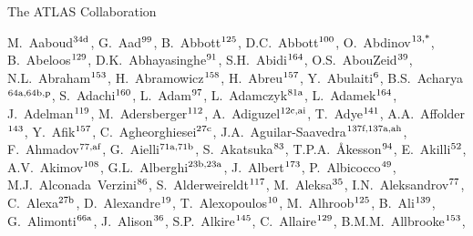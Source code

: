  
\begin{flushleft}
{\Large The ATLAS Collaboration}

\bigskip

M.~Aaboud$^\textrm{\scriptsize 34d}$,    
G.~Aad$^\textrm{\scriptsize 99}$,    
B.~Abbott$^\textrm{\scriptsize 125}$,    
D.C.~Abbott$^\textrm{\scriptsize 100}$,    
O.~Abdinov$^\textrm{\scriptsize 13,*}$,    
B.~Abeloos$^\textrm{\scriptsize 129}$,    
D.K.~Abhayasinghe$^\textrm{\scriptsize 91}$,    
S.H.~Abidi$^\textrm{\scriptsize 164}$,    
O.S.~AbouZeid$^\textrm{\scriptsize 39}$,    
N.L.~Abraham$^\textrm{\scriptsize 153}$,    
H.~Abramowicz$^\textrm{\scriptsize 158}$,    
H.~Abreu$^\textrm{\scriptsize 157}$,    
Y.~Abulaiti$^\textrm{\scriptsize 6}$,    
B.S.~Acharya$^\textrm{\scriptsize 64a,64b,p}$,    
S.~Adachi$^\textrm{\scriptsize 160}$,    
L.~Adam$^\textrm{\scriptsize 97}$,    
L.~Adamczyk$^\textrm{\scriptsize 81a}$,    
L.~Adamek$^\textrm{\scriptsize 164}$,    
J.~Adelman$^\textrm{\scriptsize 119}$,    
M.~Adersberger$^\textrm{\scriptsize 112}$,    
A.~Adiguzel$^\textrm{\scriptsize 12c,ai}$,    
T.~Adye$^\textrm{\scriptsize 141}$,    
A.A.~Affolder$^\textrm{\scriptsize 143}$,    
Y.~Afik$^\textrm{\scriptsize 157}$,    
C.~Agheorghiesei$^\textrm{\scriptsize 27c}$,    
J.A.~Aguilar-Saavedra$^\textrm{\scriptsize 137f,137a,ah}$,    
F.~Ahmadov$^\textrm{\scriptsize 77,af}$,    
G.~Aielli$^\textrm{\scriptsize 71a,71b}$,    
S.~Akatsuka$^\textrm{\scriptsize 83}$,    
T.P.A.~{\AA}kesson$^\textrm{\scriptsize 94}$,    
E.~Akilli$^\textrm{\scriptsize 52}$,    
A.V.~Akimov$^\textrm{\scriptsize 108}$,    
G.L.~Alberghi$^\textrm{\scriptsize 23b,23a}$,    
J.~Albert$^\textrm{\scriptsize 173}$,    
P.~Albicocco$^\textrm{\scriptsize 49}$,    
M.J.~Alconada~Verzini$^\textrm{\scriptsize 86}$,    
S.~Alderweireldt$^\textrm{\scriptsize 117}$,    
M.~Aleksa$^\textrm{\scriptsize 35}$,    
I.N.~Aleksandrov$^\textrm{\scriptsize 77}$,    
C.~Alexa$^\textrm{\scriptsize 27b}$,    
D.~Alexandre$^\textrm{\scriptsize 19}$,    
T.~Alexopoulos$^\textrm{\scriptsize 10}$,    
M.~Alhroob$^\textrm{\scriptsize 125}$,    
B.~Ali$^\textrm{\scriptsize 139}$,    
G.~Alimonti$^\textrm{\scriptsize 66a}$,    
J.~Alison$^\textrm{\scriptsize 36}$,    
S.P.~Alkire$^\textrm{\scriptsize 145}$,    
C.~Allaire$^\textrm{\scriptsize 129}$,    
B.M.M.~Allbrooke$^\textrm{\scriptsize 153}$,    

\end{flushleft}

